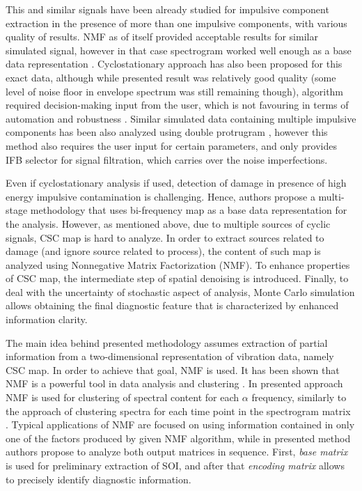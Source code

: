 \documentclass[3p, 12pt]{elsarticle} %
\begin{document}
This and similar signals have been already studied for impulsive component extraction in the presence of more than one impulsive components, with various quality of results. NMF as of itself provided acceptable results for similar simulated signal, however in that case spectrogram worked well enough as a base data representation \cite{wodecki2017novel}. Cyclostationary approach has also been proposed for this exact data, although while presented result was relatively good quality (some level of noise floor in envelope spectrum was still remaining though), algorithm required decision-making input from the user, which is not favouring in terms of automation and robustness \cite{barszcz2013bearings}. Similar simulated data containing multiple impulsive components has been also analyzed using double protrugram \cite{kruczek2017modified}, however this method also requires the user input for certain parameters, and only provides IFB selector for signal filtration, which carries over the noise imperfections.

Even if cyclostationary analysis if used, detection of damage in presence of high energy impulsive contamination is challenging. Hence, authors propose a multi-stage methodology that uses bi-frequency map as a base data representation for the analysis. However, as mentioned above, due to multiple sources of cyclic signals, CSC map is hard to analyze. In order to extract sources related to damage (and ignore source related to process), the content of such map is analyzed using Nonnegative Matrix Factorization (NMF). To enhance properties of CSC map, the intermediate step of spatial denoising is introduced. Finally, to deal with the uncertainty of stochastic aspect of analysis, Monte Carlo simulation allows obtaining the final diagnostic feature that is characterized by enhanced information clarity.

The main idea behind presented methodology assumes extraction of partial information from a two-dimensional representation of vibration data, namely CSC map. In order to achieve that goal, NMF is used. It has been shown that NMF is a powerful tool in data analysis and clustering \cite{cichocki2009nonnegative, wang2013nonnegative,lee1999learning, he2011symmetric}. In presented approach NMF is used for clustering of spectral content for each $\alpha$ frequency, similarly to the approach of clustering spectra for each time point in the spectrogram matrix \cite{wodecki2017local}.
Typical applications of NMF are focused on using information contained in only one of the factors produced by given NMF algorithm, while in presented method authors propose to analyze both output matrices in sequence. First, \emph{base matrix} is used for preliminary extraction of SOI, and after that \emph{encoding matrix} allows to precisely identify diagnostic information.
\end{document}
